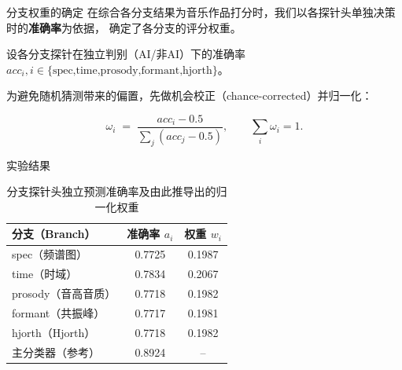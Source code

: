 \documentclass[aspectratio=169]{beamer}
\begin{document}
\begin{frame}{分支权重的确定}
在综合各分支结果为音乐作品打分时，我们以各探针头单独决策时的\textbf{准确率}为依据，
确定了各分支的评分权重。

设各分支探针在独立判别（AI/非AI）下的准确率
$acc_i,i\in\{\text{spec,time,prosody,formant,hjorth}\}$。

为避免随机猜测带来的偏置，先做机会校正（chance-corrected）并归一化：

\begin{equation}
    \omega_i \;=\; \frac{acc_i-0.5}{\sum_j (acc_j-0.5)},\qquad 
    \sum_i \omega_i = 1.
    \label{eq:branch_weight}
\end{equation}
\end{frame}


\begin{frame}{实验结果}

\begin{table}[htbp]
\centering
\caption{分支探针头独立预测准确率及由此推导出的归一化权重}
\label{tab:probe-acc-weight}
\begin{tabular}{lcc}
\toprule
分支（Branch） & 准确率 $a_i$ & 权重 $w_i$ \\
\midrule
spec（频谱图）      & 0.7725 & 0.1987 \\
time（时域）        & 0.7834 & 0.2067 \\
prosody（音高音质） & 0.7718 & 0.1982 \\
formant（共振峰）   & 0.7717 & 0.1981 \\
hjorth（Hjorth）    & 0.7718 & 0.1982 \\
\midrule
主分类器（参考）    & 0.8924 & -- \\
\bottomrule
\end{tabular}
\end{table}
\end{frame}
\end{document}
